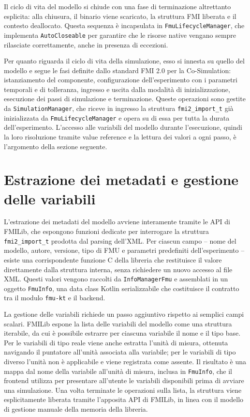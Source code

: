 Il ciclo di vita del modello si chiude con una fase di terminazione altrettanto esplicita: alla chiusura, il binario viene scaricato, la struttura FMI liberata e il contesto deallocato. Questa sequenza è incapsulata in \texttt{FmuLifecycleManager}, che implementa \texttt{AutoCloseable} per garantire che le risorse native vengano sempre rilasciate correttamente, anche in presenza di eccezioni.

Per quanto riguarda il ciclo di vita della simulazione, esso si innesta su quello del modello e segue le fasi definite dallo standard FMI 2.0 per la Co-Simulation: istanziamento del componente, configurazione dell'esperimento con i parametri temporali e di tolleranza, ingresso e uscita dalla modalità di inizializzazione, esecuzione dei passi di simulazione e terminazione. Queste operazioni sono gestite da \texttt{SimulationManager}, che riceve in ingresso la struttura \texttt{fmi2\_import\_t} già inizializzata da \texttt{FmuLifecycleManager} e opera su di essa per tutta la durata dell'esperimento. L'accesso alle variabili del modello durante l'esecuzione, quindi la loro risoluzione tramite value reference e la lettura dei valori a ogni passo, è l'argomento della sezione seguente.

\section{Estrazione dei metadati e gestione delle variabili}
\label{sec:impl-metadati}

L'estrazione dei metadati del modello avviene interamente tramite le API di \\FMILib, che espongono funzioni dedicate per interrogare la struttura \\\texttt{fmi2\_import\_t} prodot\-ta dal parsing dell'XML. Per ciascun campo -- nome del modello, autore, versione, tipo di FMU e parametri predefiniti dell'esperimento -- esiste una corrispondente funzione C della libreria che restituisce il valore direttamente dalla struttura interna, senza richiedere un nuovo accesso al file XML. Questi valori vengono raccolti da \texttt{InfoManagerFmu} e assemblati in un oggetto \texttt{FmuInfo}, una data class Kotlin serializzabile che costituisce il contratto tra il modulo \texttt{fmu-kt} e il backend.

La gestione delle variabili richiede un passo aggiuntivo rispetto ai semplici campi scalari. FMILib espone la lista delle variabili del modello come una struttura iterabile, da cui è possibile estrarre per ciascuna variabile il nome e il tipo base. Per le variabili di tipo reale viene anche estratta l'unità di misura, ottenuta navigando il puntatore all'unità associata alla variabile; per le variabili di tipo diverso l'unità non è applicabile e viene registrata come assente. Il risultato è una mappa dal nome della variabile all'unità di misura, inclusa in \texttt{FmuInfo}, che il frontend utilizza per presentare all'utente le variabili disponibili prima di avviare una simulazione. Una volta terminate le operazioni sulla lista, la struttura viene esplicitamente liberata tramite l'apposita API di FMILib, in linea con il modello di gestione manuale della memoria della libreria.

